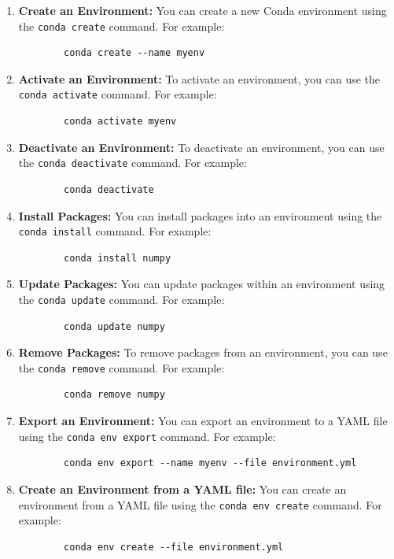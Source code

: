 \begin{enumerate}
	\item \textbf{Create an Environment:} You can create a new Conda environment using the \texttt{conda create} command. For example:
	
	\begin{verbatim}
		conda create --name myenv
	\end{verbatim}
	
	\item \textbf{Activate an Environment:} To activate an environment, you can use the \texttt{conda activate} command. For example:
	
	\begin{verbatim}
		conda activate myenv
	\end{verbatim}
	
	\item \textbf{Deactivate an Environment:} To deactivate an environment, you can use the \texttt{conda deactivate} command. For example:
	
	\begin{verbatim}
		conda deactivate
	\end{verbatim}
	
	\item \textbf{Install Packages:} You can install packages into an environment using the \texttt{conda install} command. For example:
	
	\begin{verbatim}
		conda install numpy
	\end{verbatim}
	
	\item \textbf{Update Packages:} You can update packages within an environment using the \texttt{conda update} command. For example:
	
	\begin{verbatim}
		conda update numpy
	\end{verbatim}
	
	\item \textbf{Remove Packages:} To remove packages from an environment, you can use the \texttt{conda remove} command. For example:
	
	\begin{verbatim}
		conda remove numpy
	\end{verbatim}
	
	\item \textbf{Export an Environment:} You can export an environment to a YAML file using the \texttt{conda env export} command. For example:
	
	\begin{verbatim}
		conda env export --name myenv --file environment.yml
	\end{verbatim}
	
	\item \textbf{Create an Environment from a YAML file:} You can create an environment from a YAML file using the \texttt{conda env create} command. For example:
	
	\begin{verbatim}
		conda env create --file environment.yml
	\end{verbatim}
	
\end{enumerate}


